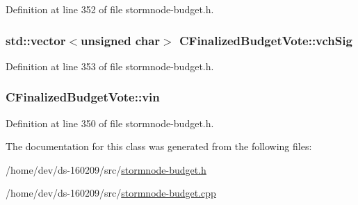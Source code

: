 Definition at line 352 of file stormnode-\/budget.\+h.

\hypertarget{class_c_finalized_budget_vote_a8068f2ad5defbc62be4221ecacef011f}{}
\subsubsection[{vch\+Sig}]{\setlength{\rightskip}{0pt plus 5cm}std\+::vector$<$unsigned char$>$ C\+Finalized\+Budget\+Vote\+::vch\+Sig}\label{class_c_finalized_budget_vote_a8068f2ad5defbc62be4221ecacef011f}


Definition at line 353 of file stormnode-\/budget.\+h.

\hypertarget{class_c_finalized_budget_vote_adcfb3d5520f8374deac4f3b4f6eb24cc}{}
\subsubsection[{vin}]{ C\+Finalized\+Budget\+Vote\+::vin}\label{class_c_finalized_budget_vote_adcfb3d5520f8374deac4f3b4f6eb24cc}


Definition at line 350 of file stormnode-\/budget.\+h.



The documentation for this class was generated from the following files\+:\begin{DoxyCompactItemize}
\item 
/home/dev/ds-\/160209/src/\hyperlink{stormnode-budget_8h}{stormnode-\/budget.\+h}\item 
/home/dev/ds-\/160209/src/\hyperlink{stormnode-budget_8cpp}{stormnode-\/budget.\+cpp}\end{DoxyCompactItemize}
